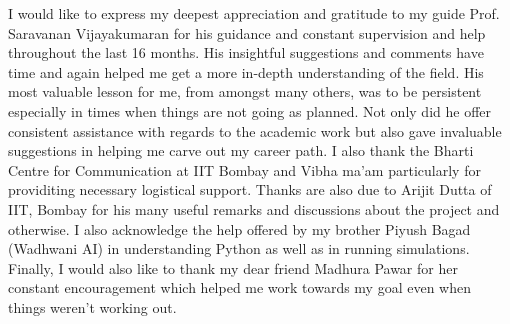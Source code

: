 \acknowledgments

I would like to express my deepest appreciation and gratitude to my guide Prof.
Saravanan Vijayakumaran for his guidance and constant supervision and help throughout the last 16 months. 
His insightful suggestions and comments have time and again helped me get a more in-depth understanding of the field.
His most valuable lesson for me, from amongst many others, was to be persistent especially in times when things are not going as planned. 
Not only did he offer consistent assistance with regards to the academic work but also gave invaluable suggestions in helping me carve out my career path. 
I also thank the Bharti Centre for Communication at IIT Bombay and Vibha ma'am particularly for providiting necessary logistical support.
Thanks are also due to Arijit Dutta of IIT, Bombay for his many useful remarks and discussions about the project and otherwise. 
I also acknowledge the help offered by my brother Piyush Bagad (Wadhwani AI) in understanding Python as well as in running simulations. 
Finally, I would also like to thank my dear friend Madhura Pawar for her constant encouragement
which helped me work towards my goal even when things weren't working out.





\signature{\today}


